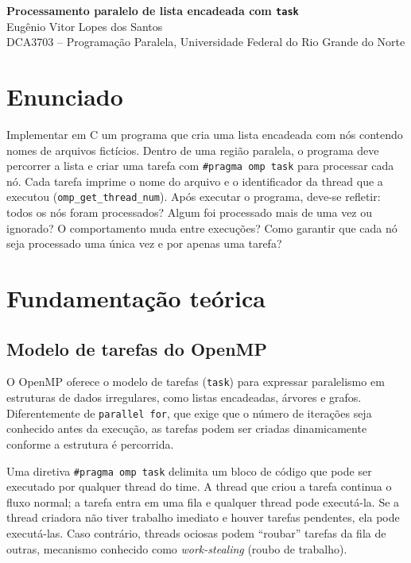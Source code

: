 \documentclass[11pt,letterpaper]{article}
\begin{document}
\pagestyle{plain}

\begin{center}
    {\LARGE\bfseries Processamento paralelo de lista encadeada com \texttt{task}}\\[0.4em]
    {\normalsize Eugênio Vitor Lopes dos Santos}\\[0.3em]
    {\small DCA3703 -- Programação Paralela, Universidade Federal do Rio Grande do Norte}\\[0.3em]
\end{center}

\section{Enunciado}
Implementar em C um programa que cria uma lista encadeada com nós contendo nomes de arquivos fictícios. Dentro de uma região paralela, o programa deve percorrer a lista e criar uma tarefa com \texttt{\#pragma omp task} para processar cada nó. Cada tarefa imprime o nome do arquivo e o identificador da thread que a executou (\texttt{omp\_get\_thread\_num}). Após executar o programa, deve-se refletir: todos os nós foram processados? Algum foi processado mais de uma vez ou ignorado? O comportamento muda entre execuções? Como garantir que cada nó seja processado uma única vez e por apenas uma tarefa?

\section{Fundamentação teórica}

\subsection{Modelo de tarefas do OpenMP}
O OpenMP oferece o modelo de tarefas (\texttt{task}) para expressar paralelismo em estruturas de dados irregulares, como listas encadeadas, árvores e grafos. Diferentemente de \texttt{parallel for}, que exige que o número de iterações seja conhecido antes da execução, as tarefas podem ser criadas dinamicamente conforme a estrutura é percorrida.

Uma diretiva \texttt{\#pragma omp task} delimita um bloco de código que pode ser executado por qualquer thread do time. A thread que criou a tarefa continua o fluxo normal; a tarefa entra em uma fila e qualquer thread pode executá-la. Se a thread criadora não tiver trabalho imediato e houver tarefas pendentes, ela pode executá-las. Caso contrário, threads ociosas podem ``roubar'' tarefas da fila de outras, mecanismo conhecido como \textit{work-stealing} (roubo de trabalho).
\end{document}
